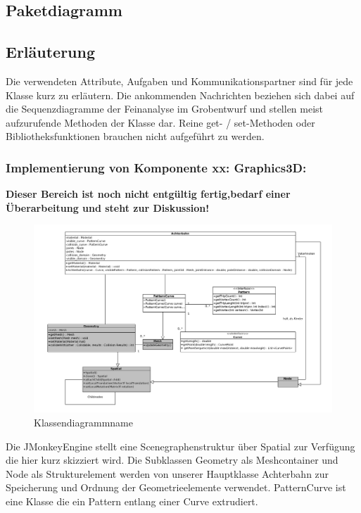 \subsection{Paketdiagramm}
\subsection{Erläuterung}

Die verwendeten Attribute, Aufgaben und Kommunikationspartner sind für jede
Klasse kurz zu erläutern. Die ankommenden Nachrichten beziehen sich dabei auf
die Sequenzdiagramme der Feinanalyse im Grobentwurf und stellen meist
aufzurufende Methoden der Klasse dar.  Reine get- / set-Methoden oder
Bibliotheksfunktionen brauchen nicht aufgeführt zu werden.


\subsubsection{Implementierung von Komponente
         xx: Graphics3D:}

\textbf {Dieser Bereich ist noch nicht entgültig fertig,bedarf einer Überarbeitung und steht zur Diskussion!}

\begin{figure}
\includegraphics[width=\linewidth]{bilder/klassendiagramm_004}
\caption{Klassendiagrammname}
\end{figure}

Die JMonkeyEngine stellt eine Scenegraphenstruktur über Spatial zur Verfügung die hier kurz skizziert wird. Die Subklassen Geometry als Meshcontainer und Node als Strukturelement werden von unserer Hauptklasse Achterbahn 
zur Speicherung und Ordnung der Geometrieelemente verwendet. PatternCurve ist eine Klasse die ein Pattern entlang einer Curve extrudiert.

